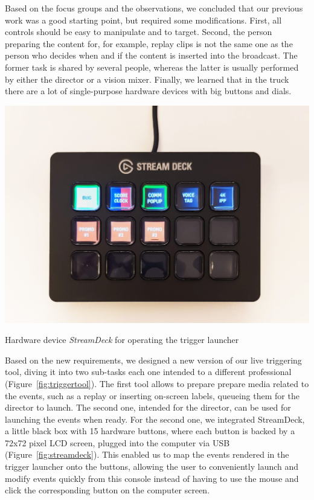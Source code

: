 \documentclass[sigchi-a, authorversion]{acmart}
\begin{document}
Based on the focus groups and the observations, we concluded that our previous
work was a good starting point, but required some modifications. First, all
controls should be easy to manipulate and to target. Second, the person
preparing the content for, for example, replay clips is not the same one as the
person who decides when and if the content is inserted into the broadcast. The
former task is shared by several people, whereas the latter is usually performed
by either the director or a vision mixer. Finally, we learned that in the truck
there are a lot of single-purpose hardware devices with big buttons and dials.

\begin{marginfigure}
    \includegraphics[width=\marginparwidth-10pt]{Figures/streamdeck.jpg}
    \caption{Hardware device \emph{StreamDeck} for operating the trigger launcher}
    \label{fig:streamdeck}
\end{marginfigure}

Based on the new requirements, we designed a new version of our live triggering
tool, diving it into two sub-tasks each one intended to a different professional
(Figure~\ref{fig:triggertool}). The first tool allows to prepare prepare media
related to the events, such as a replay or inserting on-screen labels, queueing
them for the director to launch. The second one, intended for the director, can
be used for launching the events when ready. For the second one, we integrated
StreamDeck, a little black box with 15 hardware buttons, where each button is
backed by a 72x72 pixel LCD screen, plugged into the computer via USB
(Figure~\ref{fig:streamdeck}). This enabled us to map the events rendered in the
trigger launcher onto the buttons, allowing the user to conveniently launch and
modify events quickly from this console instead of having to use the mouse and
click the corresponding button on the computer screen.
\end{document}
